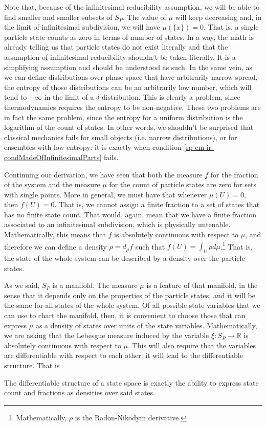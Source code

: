 Note that, because of the infinitesimal reducibility assumption, we will be able to find smaller and smaller subsets of $S_P$. The value of $\mu$ will keep decreasing and, in the limit of infinitesimal subdivision, we will have $\mu(\{x\})=0$. That is, a single particle state counts as zero in terms of number of states. In a way, the math is already telling us that particle states do not exist literally and that the assumption of infinitesimal reducibility shouldn't be taken literally. It is a simplifying assumption and should be understood as such. In the same vein, as we can define distributions over phase space that have arbitrarily narrow spread, the entropy of those distributions can be an arbitrarily low number, which will tend to $-\infty$ in the limit of a $\delta$-distribution. This is clearly a problem, since thermodynamics requires the entropy to be non-negative. These two problems are in fact the same problem, since the entropy for a uniform distribution is the logarithm of the count of states. In other words, we shouldn't be surprised that classical mechanics fails for small objects (i.e. narrow distributions), or for ensembles with low entropy: it is exactly when condition \ref{rp-cm-ir-condMadeOfInfinitesimalParts} fails.

Continuing our derivation, we have seen that both the measure $f$ for the fraction of the system and the measure $\mu$ for the count of particle states are zero for sets with single points. More in general, we must have that whenever $\mu(U) = 0$, then $f(U)=0$. That is, we cannot assign a finite fraction to a set of states that has no finite state count. That would, again, mean that we have a finite fraction associated to an infinitesimal subdivision, which is physically untenable. Mathematically, this means that $f$ is absolutely continuous with respect to $\mu$, and therefore we can define a density $\rho = d_{\mu}f$ such that $f(U) = \int_U \rho d\mu$.\footnote{Mathematically, $\rho$ is the Radon-Nikodym derivative.} That is, the state of the whole system can be described by a density over the particle states.

As we said, $S_P$ is a manifold. The measure $\mu$ is a feature of that manifold, in the sense that it depends only on the properties of the particle states, and it will be the same for all states of the whole system. Of all possible state variables that we can use to chart the manifold, then, it is convenient to choose those that can express $\mu$ as a density of states over units of the state variables. Mathematically, we are asking that the Lebesgue measure induced by the variable $\xi : S_P \to \mathbb{R}$ is absolutely continuous with respect to $\mu$. This will also require that the variables are differentiable with respect to each other: it will lead to the differentiable structure. That is
\begin{insight}
	The differentiable structure of a state space is exactly the ability to express state count and fractions as densities over said states.
\end{insight} 

